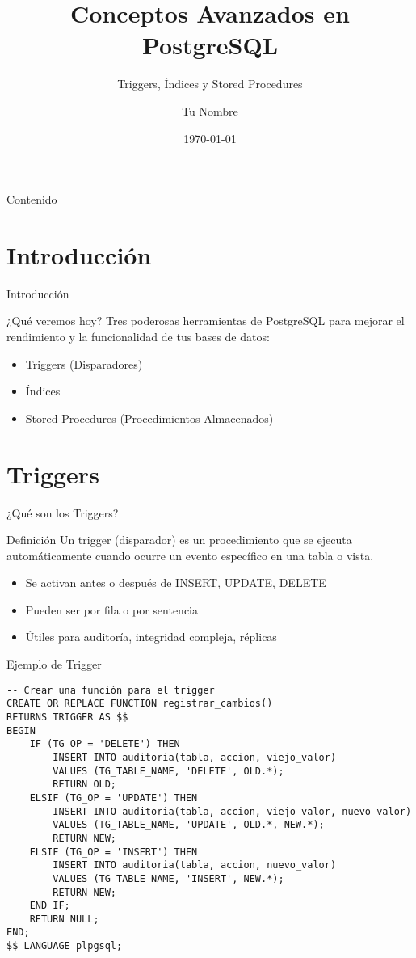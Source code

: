 \documentclass{beamer}
\title{Conceptos Avanzados en PostgreSQL}
\subtitle{Triggers, Índices y Stored Procedures}
\author{Tu Nombre}
\date{\today}
\begin{document}
\begin{frame}
\titlepage
\end{frame}

\begin{frame}{Contenido}
\tableofcontents
\end{frame}

\section{Introducción}
\begin{frame}{Introducción}
\begin{block}{¿Qué veremos hoy?}
Tres poderosas herramientas de PostgreSQL para mejorar el rendimiento y la funcionalidad de tus bases de datos:
\begin{itemize}
\item Triggers (Disparadores)
\item Índices
\item Stored Procedures (Procedimientos Almacenados)
\end{itemize}
\end{block}
\end{frame}

\section{Triggers}
\begin{frame}{¿Qué son los Triggers?}
\begin{block}{Definición}
Un trigger (disparador) es un procedimiento que se ejecuta automáticamente cuando ocurre un evento específico en una tabla o vista.
\end{block}

\begin{itemize}
\item Se activan antes o después de INSERT, UPDATE, DELETE
\item Pueden ser por fila o por sentencia
\item Útiles para auditoría, integridad compleja, réplicas
\end{itemize}
\end{frame}

\begin{frame}[fragile]{Ejemplo de Trigger}
\begin{lstlisting}
-- Crear una función para el trigger
CREATE OR REPLACE FUNCTION registrar_cambios()
RETURNS TRIGGER AS $$
BEGIN
    IF (TG_OP = 'DELETE') THEN
        INSERT INTO auditoria(tabla, accion, viejo_valor)
        VALUES (TG_TABLE_NAME, 'DELETE', OLD.*);
        RETURN OLD;
    ELSIF (TG_OP = 'UPDATE') THEN
        INSERT INTO auditoria(tabla, accion, viejo_valor, nuevo_valor)
        VALUES (TG_TABLE_NAME, 'UPDATE', OLD.*, NEW.*);
        RETURN NEW;
    ELSIF (TG_OP = 'INSERT') THEN
        INSERT INTO auditoria(tabla, accion, nuevo_valor)
        VALUES (TG_TABLE_NAME, 'INSERT', NEW.*);
        RETURN NEW;
    END IF;
    RETURN NULL;
END;
$$ LANGUAGE plpgsql;
\end{lstlisting}
\end{frame}
\end{document}
